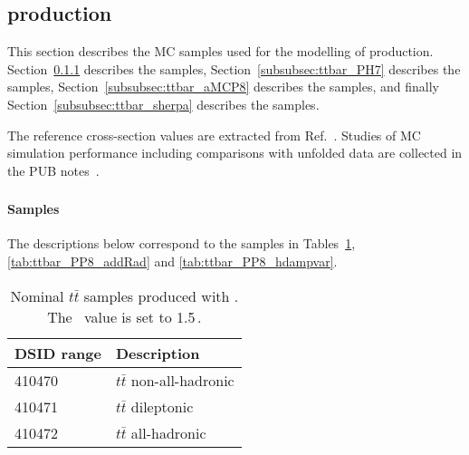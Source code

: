 \subsection[\ttbar production]{\ttbar production}
\label{subsec:ttbar}

This section describes the MC samples used for the modelling of \ttbar production.
Section~\ref{subsubsec:ttbar_PP8} describes the \POWPY[8] samples,
Section~\ref{subsubsec:ttbar_PH7} describes the \POWHER[7] samples,
Section~\ref{subsubsec:ttbar_aMCP8} describes the \MGNLOPY[8] samples,
and finally Section~\ref{subsubsec:ttbar_sherpa} describes the \SHERPA samples.

The reference cross-section values are extracted from Ref.~\cite{LHCTopWGttbarXsec}.
Studies of MC simulation performance including comparisons with unfolded data 
are collected in the PUB notes~\cite{ATL-PHYS-PUB-2018-009,ATL-PHYS-PUB-2017-007,ATL-PHYS-PUB-2016-020}.

\subsubsection[Powheg+Pythia8]{\POWPY[8]}
\label{subsubsec:ttbar_PP8}

\paragraph{Samples}

The descriptions below correspond to the samples in Tables~\ref{tab:ttbar_PP8}, \ref{tab:ttbar_PP8_addRad} and \ref{tab:ttbar_PP8_hdampvar}.

\begin{table}[htbp]
\begin{center}
\caption{Nominal $t\bar{t}$ samples produced with \POWPY[8]. The \hdamp\ value is set to 1.5\,\mtop.} 
\label{tab:ttbar_PP8}
\begin{tabular}{ l | l }
\hline
DSID range & Description \\
\hline
410470 & $t\bar{t}$ non-all-hadronic \\
410471 & $t\bar{t}$ dileptonic \\
410472 & $t\bar{t}$ all-hadronic \\
\hline
\end{tabular}
\end{center}
\end{table}

